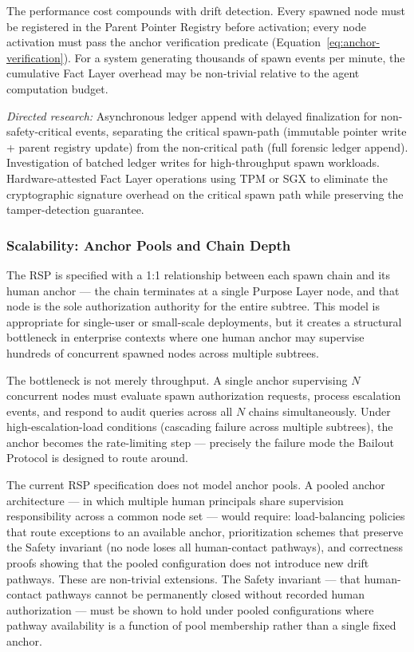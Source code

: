 The performance cost compounds with drift detection. Every spawned node must be registered in the Parent Pointer Registry before activation; every node activation must pass the anchor verification predicate (Equation~\eqref{eq:anchor-verification}). For a system generating thousands of spawn events per minute, the cumulative Fact Layer overhead may be non-trivial relative to the agent computation budget.

\textit{Directed research:} Asynchronous ledger append with delayed finalization for non-safety-critical events, separating the critical spawn-path (immutable pointer write + parent registry update) from the non-critical path (full forensic ledger append). Investigation of batched ledger writes for high-throughput spawn workloads. Hardware-attested Fact Layer operations using TPM or SGX to eliminate the cryptographic signature overhead on the critical spawn path while preserving the tamper-detection guarantee.

\subsubsection{Scalability: Anchor Pools and Chain Depth}
\label{sec:scalability-rsp}

The RSP is specified with a 1:1 relationship between each spawn chain and its human anchor — the chain terminates at a single Purpose Layer node, and that node is the sole authorization authority for the entire subtree. This model is appropriate for single-user or small-scale deployments, but it creates a structural bottleneck in enterprise contexts where one human anchor may supervise hundreds of concurrent spawned nodes across multiple subtrees.

The bottleneck is not merely throughput. A single anchor supervising $N$ concurrent nodes must evaluate spawn authorization requests, process escalation events, and respond to audit queries across all $N$ chains simultaneously. Under high-escalation-load conditions (cascading failure across multiple subtrees), the anchor becomes the rate-limiting step — precisely the failure mode the Bailout Protocol is designed to route around.

The current RSP specification does not model anchor pools. A pooled anchor architecture — in which multiple human principals share supervision responsibility across a common node set — would require: load-balancing policies that route exceptions to an available anchor, prioritization schemes that preserve the Safety invariant (no node loses all human-contact pathways), and correctness proofs showing that the pooled configuration does not introduce new drift pathways. These are non-trivial extensions. The Safety invariant — that human-contact pathways cannot be permanently closed without recorded human authorization — must be shown to hold under pooled configurations where pathway availability is a function of pool membership rather than a single fixed anchor.

